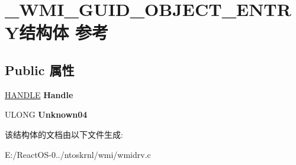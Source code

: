 \hypertarget{struct___w_m_i___g_u_i_d___o_b_j_e_c_t___e_n_t_r_y}{}\section{\+\_\+\+W\+M\+I\+\_\+\+G\+U\+I\+D\+\_\+\+O\+B\+J\+E\+C\+T\+\_\+\+E\+N\+T\+R\+Y结构体 参考}
\label{struct___w_m_i___g_u_i_d___o_b_j_e_c_t___e_n_t_r_y}
\subsection*{Public 属性}
\begin{DoxyCompactItemize}
\item 
\mbox{\label{struct___w_m_i___g_u_i_d___o_b_j_e_c_t___e_n_t_r_y_a5b1d834dafff12ad94efee0901b8819c}} 
\hyperlink{interfacevoid}{H\+A\+N\+D\+LE} {\bfseries Handle}
\item 
\mbox{\label{struct___w_m_i___g_u_i_d___o_b_j_e_c_t___e_n_t_r_y_af51c9b27bb1ea1d199e68c1eab5a6978}} 
U\+L\+O\+NG {\bfseries Unknown04}
\end{DoxyCompactItemize}


该结构体的文档由以下文件生成\+:\begin{DoxyCompactItemize}
\item 
E\+:/\+React\+O\+S-\/0../ntoskrnl/wmi/wmidrv.\+c\end{DoxyCompactItemize}
